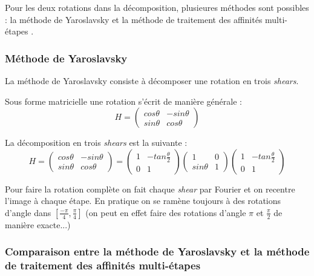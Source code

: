 
Pour les deux rotations dans la décomposition, plusieures méthodes sont possibles : la méthode de Yaroslavsky \cite{unser1995convolution} et la méthode de traitement des affinités multi-étapes \cite{szeliski2010high}.

\subsubsection{Méthode de Yaroslavsky}

La méthode de Yaroslavsky consiste à décomposer une rotation en trois \emph{shears}.

Sous forme matricielle une rotation s'écrit de manière générale :
\begin{equation*}
	H=\begin{pmatrix}
	cos \theta&-sin \theta\\sin \theta&cos \theta
	\end{pmatrix}
	\end{equation*}

La décomposition en trois \emph{shears} est la suivante :
\begin{equation*}
	H=\begin{pmatrix}
	cos \theta&-sin \theta\\sin \theta&cos \theta
	\end{pmatrix}=\begin{pmatrix}
	1&-tan \frac{\theta}{2}\\0&1
	\end{pmatrix}\begin{pmatrix}
	1&0\\sin \theta&1
	\end{pmatrix}\begin{pmatrix}
	1&-tan \frac{\theta}{2}\\0&1
	\end{pmatrix}
	\end{equation*}

	Pour faire la rotation complète on fait chaque \emph{shear} par Fourier et on recentre l'image à chaque étape.
	En pratique on se ramène toujours à des rotations d'angle dans $[\frac{-\pi}{4},\frac{\pi}{4}]$ (on peut en effet faire des rotations d'angle $\pi$ et $\frac{\pi}{2}$ de manière exacte...)  


\subsubsection{Comparaison entre la méthode de Yaroslavsky et la méthode de traitement des affinités multi-étapes}

